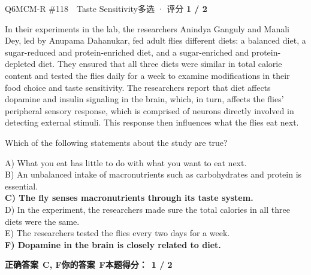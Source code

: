 \begin{qblock}{Q6\quad MCM-R \#118\ \ Taste Sensitivity}{多选 · 评分 \textcolor{cAccent}{\bfseries 1 / 2}}
\begin{promptbox}
In their experiments in the lab, the researchers Anindya Ganguly and Manali Dey, led by Anupama Dahanukar, fed adult flies different diets: a balanced diet, a sugar-reduced and protein-enriched diet, and a sugar-enriched and protein-depleted diet. They ensured that all three diets were similar in total calorie content and tested the flies daily for a week to examine modifications in their food choice and taste sensitivity. The researchers report that diet affects dopamine and insulin signaling in the brain, which, in turn, affects the flies' peripheral sensory response, which is comprised of neurons directly involved in detecting external stimuli. This response then influences what the flies eat next.
\end{promptbox}
\begin{notebox}Which of the following statements about the study are true?\end{notebox}
{\small
A) What you eat has little to do with what you want to eat next.\\
B) An unbalanced intake of macronutrients such as carbohydrates and protein is essential.\\
{\color{cFix}\textbf{C) The fly senses macronutrients through its taste system.}}\\
D) In the experiment, the researchers made sure the total calories in all three diets were the same.\\
E) The researchers tested the flies every two days for a week.\\
{\color{cFix}\textbf{F) Dopamine in the brain is closely related to diet.}}}
\par\smallskip
\textbf{正确答案}\ \textcolor{cFix}{\bfseries C, F}\qquad\textbf{你的答案}\ {\color{cWrong}\bfseries F}\qquad\textbf{本题得分：}\ {\color{cAccent}\bfseries 1 / 2}
\end{qblock}

